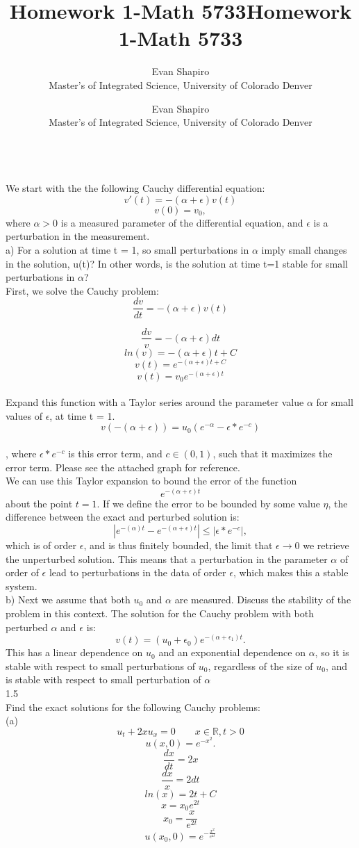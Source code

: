 \documentclass{article}
\title{Homework 1-Math 5733}
\author{Evan Shapiro \\ Master's of Integrated Science, University of Colorado Denver}
\begin{document}
\title{Homework 1-Math 5733}
\author{Evan Shapiro \\ Master's of Integrated Science, University of Colorado Denver}
\\
We start with the the following Cauchy differential equation:
\[ v'(t)= - (\alpha + \epsilon)v(t) \]
\[ v(0) = v_{0}, \]
where \(\alpha > 0\) is a measured parameter of the differential equation, and \(\epsilon\) is a perturbation in the measurement.\\
a) For a solution at time t = 1, so small perturbations in \(\alpha\) imply small changes in the solution, u(t)? In other words, is the solution at time t=1 stable for small perturbations in \(\alpha\)?\\
First, we solve the Cauchy problem:
\[ \frac{dv}{dt} = -(\alpha + \epsilon)v(t)\]

\[ \frac{dv}{v} = -(\alpha + \epsilon)dt\]
\[ ln(v) = -(\alpha + \epsilon)t+C \]
\[v(t)=e^{-(\alpha +\epsilon)t+C} \]
\[v(t) = v_{0}e^{-(\alpha+\epsilon)t}\]\\
Expand this function with a Taylor series around the parameter value \(\alpha\) for small values of \(\epsilon\), at time t = 1.
\[v(-(\alpha+\epsilon)) = u_{0}( e^{-\alpha} - \epsilon*e^{-c} ) \]\\,
where \(\epsilon*e^{-c}\) is this error term, and \(c \in(0,1)\), such that it maximizes the error term.
Please see the attached graph for reference.\\
We can use this Taylor expansion to bound the error of the function 
\[ e^{-(\alpha + \epsilon)t}\]
about the point \(t=1\). If we define the error to be bounded by some value \(\eta\), the difference between the exact and perturbed solution is:
\[|  e^{-(\alpha )t}-e^{-(\alpha + \epsilon)t}| \le |\epsilon*e^{-c}|, \]
which is of order \(\epsilon\), and is thus finitely bounded, the limit that $ \epsilon \to 0$ we retrieve the unperturbed solution. This means that a perturbation in the parameter $\alpha$ of order of \( \epsilon\) lead to perturbations in the data of order $\epsilon$, which makes this a stable system. 
\\
b) Next we assume that both \(u_{0}\) and $\alpha$ are measured. Discuss the stability of the problem in this context.
The solution for the Cauchy problem with both perturbed $\alpha$ and $\epsilon$  is:
\[v(t) = (u_{0}+\epsilon_{0})e^{-(\alpha+\epsilon_{1})t}. \]
This has a linear dependence on $u_{0}$ and an exponential dependence on $\alpha$, so it is stable with respect to small perturbations of $u_{0}$, regardless of the size of $u_{0}$, and is stable with respect to small perturbation of $\alpha$\\
1.5\\
Find the exact solutions for the following Cauchy problems:\\
(a) \[ u_{t} + 2xu_{x}=0\qquad  {x \in \mathbb{R},t>0} \] 		
\[ u(x,0) = e^{-x^{2}}. \]
\[ \frac{dx}{dt} = 2x \]
\[\frac{dx}{x} = 2dt\]
\[ ln(x) = 2t +C\]
\[ x = x_{0}e^{2t}\]
\[x_{0} = \frac{x}{e^{2t}} \]
\[u(x_{0},0) = e^{-\frac{x^2}{e^{4t}}}\]
\end{document}
